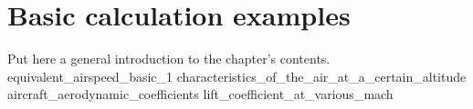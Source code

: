 \documentclass[[12pt,twoside]{book}
\begin{document}
%
%
\chapter%
   [Basic calculation examples]%
   {Basic calculation examples}
\label{chap:Basics}

\setcounter{minitocdepth}{2}%
\minitoc %

\vspace{\baselineskip}

\noindent
Put here a general introduction to the chapter's contents.
% 
{equivalent_airspeed_basic_1}
{characteristics_of_the_air_at_a_certain_altitude}
{aircraft_aerodynamic_coefficients}
{lift_coefficient_at_various_mach}
\end{document}
